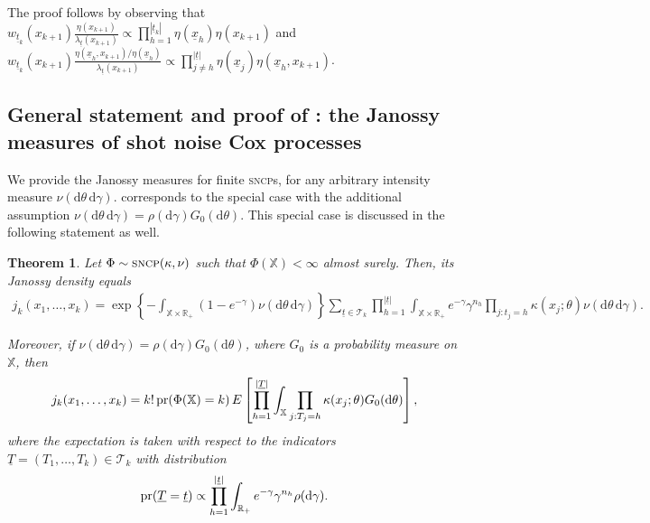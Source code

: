 \documentclass[11pt,a4paper,oneside]{article}
\newcommand{\calT}{\mathcal{T}}
\newcommand{\dd}{\mathrm d}
\newcommand{\E}{E}
\newcommand{\X}{\mathbb{X}}
\newcommand{\R}{\mathbb{R}}
\newcommand{\prob}{{\rm pr}}
\newtheorem{theorem}{Theorem}
\theoremstyle{definition}
\theoremstyle{remark}
\begin{document}
The proof follows by observing that $w_{\underline{t}_k}(x_{k+1}) \frac{\eta(x_{k+1})}{\lambda_{\underline{t}}(x_{k+1})} \propto \prod_{h=1}^{|\underline{t}_k|} \eta(\underline{x}_h) \eta(x_{k+1})$
and $w_{\underline{t}_k}(x_{k+1})  \frac{\eta(\underline{x}_h, x_{k+1}) / \eta (\underline{x}_h)}{\lambda_{\underline{t}}(x_{k+1})} \propto \prod_{j \neq h}^{|\underline{t}|} \eta(\underline{x}_j) \eta(\underline{x}_h, x_{k+1})$.


\subsection{General statement and proof of : the Janossy measures of shot noise Cox processes}\label{app:general_janossy_sncp}

We provide the Janossy measures for finite \textsc{sncp}s, for any arbitrary intensity measure $\nu(\dd \theta\, \dd \gamma)$.  corresponds to the special case with the additional assumption $\nu(\dd \theta \, \dd \gamma) = \rho(\dd \gamma) G_0(\dd \theta)$. This special case is discussed in the following statement as well. 
\begin{theorem}
    Let $\Phi \sim \textsc{sncp}(\kappa, \nu)$ such that $\Phi(\X) < \infty$ almost surely. Then, its Janossy density equals
    \begin{equation*}
        \begin{aligned}
            j_k(x_1,\ldots,x_k) = \exp\left\{ - \int_{\X\times \R_+} ( 1 - e^{-\gamma}) \nu(\dd \theta\, \dd \gamma) \right\} \sum_{\underline{t} \in \calT_k} \prod_{h=1}^{|\underline{t}|} \int_{\X\times \R_+} e^{-\gamma} \gamma^{n_h} \prod_{j: t_j = h} \kappa(x_j ; \theta) \nu(\dd \theta \,\dd \gamma).
        \end{aligned}
    \end{equation*}
     
 
 Moreover, if $\nu(\dd \theta\, \dd \gamma) = \rho(\dd \gamma) G_0(\dd \theta) $, where $G_0$ is a probability measure on $\X$, then 
\begin{equation*}
    j_k(x_1,\ldots,x_k) = k! \, \prob( \Phi(\X) = k) \,\E\left[\prod_{h=1}^{|\underline{T}|} \int_{\X}\prod_{j: T_j = h} \kappa(x_j ; \theta) G_0(\dd \theta)\right],
\end{equation*}
where the expectation is taken with respect to the indicators $\underline{T} = (T_1, \ldots, T_k) \in \calT_k$ with distribution
\begin{equation*}
\prob(\underline{T} = \underline{t}) \propto  \prod_{h=1}^{|\underline{t}|} \int_{\R_+} e^{-\gamma} \gamma^{n_h} \rho(\dd \gamma) .    
\end{equation*}
\end{theorem}
\end{document}
